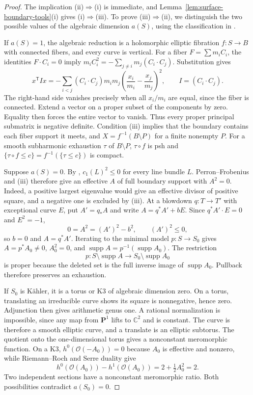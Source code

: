 \documentclass[11pt]{amsart}
\theoremstyle{definition}
\theoremstyle{remark}
\numberwithin{equation}{section}
\newcommand{\C}{\mathbb C}
\newcommand{\PP}{\mathbf P}
\newcommand{\OO}{\mathcal O}
\newcommand{\supp}{\operatorname{supp}}
\begin{document}
\begin{proof}
The implication \textup{(ii)}$\Rightarrow$\textup{(i)} is immediate, and
Lemma~\ref{lem:surface-boundary-tools}\textup{(i)} gives
\textup{(i)}$\Rightarrow$\textup{(iii)}. To prove
\textup{(iii)}$\Rightarrow$\textup{(ii)}, we distinguish the two possible
values of the algebraic dimension $a(S)$, using the classification in
\cite[\S2]{FN2005}.

If $a(S)=1$, the algebraic reduction is a
holomorphic elliptic fibration $f:S\to B$ with connected fibers,
and every curve is vertical. For a fiber $F=\sum m_iC_i$,
the identities $F\cdot C_i=0$ imply
$m_iC_i^2=-\sum_{j\ne i}m_j(C_i\cdot C_j)$. Substitution gives
\begin{equation}\label{eq:surface-fiber-intersection-identity}
 x^{\mathsf T}Ix=-\sum_{i<j}(C_i\cdot C_j)m_im_j
       \left(\frac{x_i}{m_i}-\frac{x_j}{m_j}\right)^2,
 \qquad I=(C_i\cdot C_j).
\end{equation}
The right-hand side vanishes precisely when all $x_i/m_i$ are
equal, since the fiber is connected. Extend a vector on a proper
subset of the components by zero. Equality then forces the entire
vector to vanish. Thus every proper principal submatrix is negative
definite. Condition \textup{(iii)} implies that the boundary contains
each fiber support it meets, and
$X=f^{-1}(B\setminus P)$ for a finite nonempty $P$.
For a smooth subharmonic exhaustion $\tau$ of $B\setminus P$,
$\tau\circ f$ is psh and
$\{\tau\circ f\le c\}=f^{-1}(\{\tau\le c\})$ is compact.

Suppose $a(S)=0$. By \cite[Lemma~2.1]{FN2005}, $c_1(L)^2\le0$
for every line bundle $L$. Perron--Frobenius and \textup{(iii)}
therefore give an effective $A$ of full boundary support with
$A^2=0$. Indeed, a positive largest eigenvalue would give an
effective divisor of positive square, and a negative one is excluded
by \textup{(iii)}. At a blowdown $q:T\to T'$ with exceptional curve
$E$, put $A'=q_*A$ and write $A=q^*A'+bE$. Since
$q^*A'\cdot E=0$ and $E^2=-1$,
\[
 0=A^2=(A')^2-b^2,\qquad (A')^2\le0,
\]
so $b=0$ and $A=q^*A'$. Iterating to the minimal model $p:S\to S_0$ gives
$A=p^*A_0\ne0$, $A_0^2=0$, and
$\supp A=p^{-1}(\supp A_0)$. The restriction
\[
 p:S\setminus\supp A\longrightarrow S_0\setminus\supp A_0
\]
is proper because the deleted set is the full inverse image of
$\supp A_0$. Pullback therefore preserves an exhaustion.

If $S_0$ is K\"ahler, it is a torus or K3 of algebraic dimension
zero. On a torus, translating an irreducible curve shows its square
is nonnegative, hence zero. Adjunction then gives arithmetic genus
one. A rational normalization is impossible, since any map from
$\PP^1$ lifts to $\C^2$ and is constant. The curve is therefore a
smooth elliptic curve, and a translate is an elliptic subtorus.
The quotient onto the one-dimensional torus gives a nonconstant
meromorphic function. On a K3, $h^0(\OO(-A_0))=0$ because $A_0$
is effective and nonzero, while Riemann--Roch and Serre duality give
\[
 h^0(\OO(A_0))-h^1(\OO(A_0))
 =2+\tfrac12 A_0^2=2.
\]
Two independent sections have a nonconstant meromorphic ratio.
Both possibilities contradict $a(S_0)=0$.


\end{proof}
\end{document}

